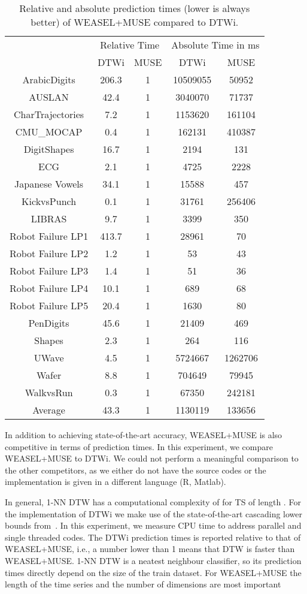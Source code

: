 \documentclass[sigconf]{acmart}
\begin{document}
\begin{table}[t]
	\begin{centering}
		\begin{tabular*}{1\columnwidth}{@{\extracolsep{\fill}}ccccc}
			& \multicolumn{2}{c}{Relative Time} & \multicolumn{2}{c}{Absolute Time in ms}\tabularnewline			
			& DTWi & MUSE & DTWi & MUSE\tabularnewline
			\hline 
			\hline 
			ArabicDigits & 206.3 & 1 & 10509055 & 50952\tabularnewline
			\hline 
			AUSLAN & 42.4 & 1 & 3040070 & 71737\tabularnewline
			\hline 
			CharTrajectories & 7.2 & 1 & 1153620 & 161104\tabularnewline
			\hline 
			CMU\_MOCAP & 0.4 & 1 & 162131 & 410387\tabularnewline
			\hline 
			DigitShapes & 16.7 & 1 & 2194 & 131\tabularnewline
			\hline 
			ECG & 2.1 & 1 & 4725 & 2228\tabularnewline
			\hline 
			Japanese Vowels & 34.1 & 1 & 15588 & 457\tabularnewline
			\hline 
			KickvsPunch & 0.1 & 1 & 31761 & 256406\tabularnewline
			\hline 
			LIBRAS & 9.7 & 1 & 3399 & 350\tabularnewline
			\hline 
			Robot Failure LP1 & 413.7 & 1 & 28961 & 70\tabularnewline
			\hline 
			Robot Failure LP2 & 1.2 & 1 & 53 & 43\tabularnewline
			\hline 
			Robot Failure LP3 & 1.4 & 1 & 51 & 36\tabularnewline
			\hline 
			Robot Failure LP4 & 10.1 & 1 & 689 & 68\tabularnewline
			\hline 
			Robot Failure LP5 & 20.4 & 1 & 1630 & 80\tabularnewline
			\hline 
			PenDigits & 45.6 & 1 & 21409 & 469\tabularnewline
			\hline 
			Shapes & 2.3 & 1 & 264 & 116\tabularnewline
			\hline 
			UWave & 4.5 & 1 & 5724667 & 1262706\tabularnewline
			\hline 
			Wafer & 8.8 & 1 & 704649 & 79945\tabularnewline
			\hline 
			WalkvsRun & 0.3 & 1 & 67350 & 242181\tabularnewline		
			\hline 
			\hline 
			{Average} & {43.3} & {1} & {1130119} & {133656}\tabularnewline
		\end{tabular*}
		\par\end{centering}
	\caption{Relative and absolute prediction times (lower is always better) of WEASEL+MUSE compared to DTWi.}
\end{table}

In addition to achieving state-of-the-art accuracy, WEASEL+MUSE is also competitive in terms of prediction times. In this experiment, we compare WEASEL+MUSE to DTWi. We could not perform a meaningful comparison to the other competitors, as we either do not have the source codes or the implementation is given in a different language (R, Matlab).

In general, 1-NN DTW has a computational complexity of  for TS of length . For the implementation of DTWi we make use of the state-of-the-art cascading lower bounds from~\cite{rakthanmanon2012searching}. In this experiment, we measure CPU time to address parallel and single threaded codes. 
The DTWi prediction times is reported relative to that of WEASEL+MUSE, i.e., a number lower than 1 means that DTW is faster than WEASEL+MUSE. 1-NN DTW is a neatest neighbour classifier, so its prediction times directly depend on the size of the train dataset. For WEASEL+MUSE the length of the time series  and the number of dimensions  are most important
\end{document}
